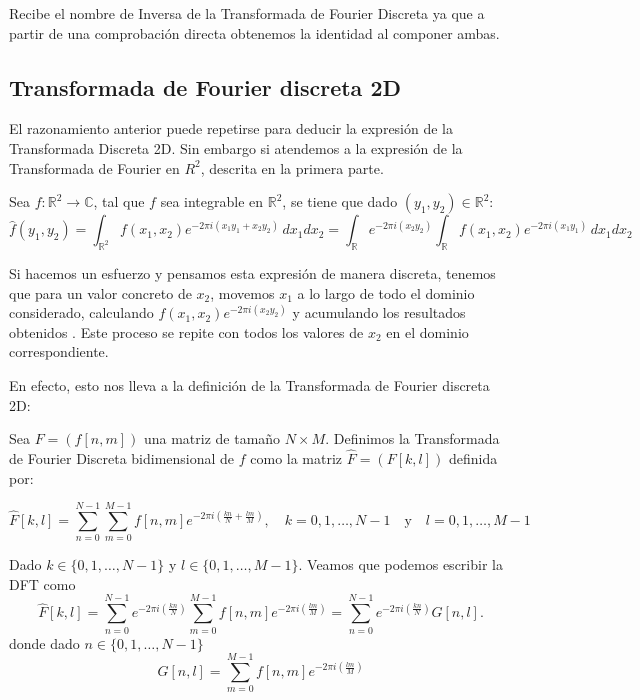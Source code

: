 \noindent Recibe el nombre de Inversa de la Transformada de Fourier Discreta ya que a partir de una comprobación directa obtenemos la identidad al componer ambas.




\subsection{Transformada de Fourier discreta 2D}
El razonamiento anterior puede repetirse para deducir la expresión de la Transformada Discreta 2D. Sin embargo si atendemos a la expresión de la Transformada de Fourier en $R^2$, descrita en la primera parte.

\noindent Sea $f: \mathbb{R}^2 \rightarrow \mathbb{C}$, tal que $f$ sea integrable en $\mathbb{R}^2$, se tiene que dado $(y_1,y_2) \in \mathbb{R}^2$: 
\begin{equation}
    \widehat{f}(y_1,y_2) = \int_{\mathbb{R}^2} f(x_1,x_2) e^{-2\pi i (x_1y_1+x_2y_2)} \, dx_1dx_2   =  \int_{\mathbb{R}}e^{-2\pi i (x_2y_2)}\int_{\mathbb{R}} f(x_1,x_2) e^{-2\pi i (x_1y_1)} \, dx_1dx_2 
\end{equation}

\noindent Si hacemos un esfuerzo y pensamos  esta expresión de manera discreta, tenemos que para un valor concreto de $x_2$, movemos $x_1$ a lo largo de todo el dominio considerado,  calculando  $ f(x_1,x_2)e^{-2\pi i (x_2y_2)}$ y acumulando los resultados obtenidos . Este proceso se repite con todos los valores de $x_2$ en el dominio correspondiente.

\noindent En efecto, esto nos lleva a la definición de la Transformada de Fourier discreta 2D:

\begin{definicion}   
Sea $F = (f[n,m])$ una matriz de tamaño $N \times M$. Definimos la Transformada de Fourier Discreta bidimensional de $f$ como la matriz $\widehat{F} = (F[k,l])$ definida por:

\begin{equation}
     \widehat{F}[k,l] = \sum_{n=0}^{N-1} \sum_{m=0}^{M-1} f[n,m] e^{-2\pi i \left(\frac{kn}{N} + \frac{lm}{M}\right)}, \quad k = 0,1,\ldots,N-1 \quad \text{y} \quad l = 0,1,\ldots,M-1
\end{equation}
\end{definicion}


\noindent Dado $k \in \{0,1,\ldots,N-1\}$ y $l \in \{0,1,\ldots,M-1\}$. Veamos que podemos escribir la DFT como
 \begin{equation} \label{eq:c}
     \widehat{F}[k,l] = \sum_{n=0}^{N-1} e^{-2\pi i \left(\frac{kn}{N}\right) }\sum_{m=0}^{M-1} f[n,m] e^{-2\pi i \left(\frac{lm}{M}\right) } = \sum_{n=0}^{N-1} e^{-2\pi i \left(\frac{kn}{N}\right) } G[n,l]. 
\end{equation}
donde dado $n \in \{0,1,\ldots,N-1\}$
\begin{equation} \label{eq:c2}
    G[n,l]=\sum_{m=0}^{M-1} f[n,m] e^{-2\pi i \left(\frac{lm}{M}\right) }
\end{equation}


